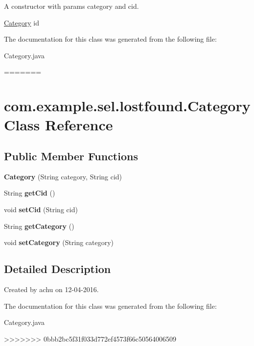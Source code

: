 A constructor with params category and cid. 

\hyperlink{classcom_1_1example_1_1sel_1_1lostfound_1_1Category}{Category} id 

The documentation for this class was generated from the following file\-:\begin{DoxyCompactItemize}
\item 
Category.\-java\end{DoxyCompactItemize}
=======
\hypertarget{classcom_1_1example_1_1sel_1_1lostfound_1_1Category}{\section{com.\-example.\-sel.\-lostfound.\-Category \-Class \-Reference}
\label{classcom_1_1example_1_1sel_1_1lostfound_1_1Category}
}
\subsection*{\-Public \-Member \-Functions}
\begin{DoxyCompactItemize}
\item 
\hypertarget{classcom_1_1example_1_1sel_1_1lostfound_1_1Category_a01e1a68dd2639ab6bee0007cc1dcf294}{{\bfseries \-Category} (\-String category, \-String cid)}\label{classcom_1_1example_1_1sel_1_1lostfound_1_1Category_a01e1a68dd2639ab6bee0007cc1dcf294}

\item 
\hypertarget{classcom_1_1example_1_1sel_1_1lostfound_1_1Category_a9394ecafd86528fa00554aecbc76ebdb}{\-String {\bfseries get\-Cid} ()}\label{classcom_1_1example_1_1sel_1_1lostfound_1_1Category_a9394ecafd86528fa00554aecbc76ebdb}

\item 
\hypertarget{classcom_1_1example_1_1sel_1_1lostfound_1_1Category_ae020ac053079f77939440df880c105d7}{void {\bfseries set\-Cid} (\-String cid)}\label{classcom_1_1example_1_1sel_1_1lostfound_1_1Category_ae020ac053079f77939440df880c105d7}

\item 
\hypertarget{classcom_1_1example_1_1sel_1_1lostfound_1_1Category_aad1c1ed95ef449791e1e27725ed60314}{\-String {\bfseries get\-Category} ()}\label{classcom_1_1example_1_1sel_1_1lostfound_1_1Category_aad1c1ed95ef449791e1e27725ed60314}

\item 
\hypertarget{classcom_1_1example_1_1sel_1_1lostfound_1_1Category_a64b466d2eed1b6eafe4d2a5785aaf7e4}{void {\bfseries set\-Category} (\-String category)}\label{classcom_1_1example_1_1sel_1_1lostfound_1_1Category_a64b466d2eed1b6eafe4d2a5785aaf7e4}

\end{DoxyCompactItemize}


\subsection{\-Detailed \-Description}
\-Created by achu on 12-\/04-\/2016. 

\-The documentation for this class was generated from the following file\-:\begin{DoxyCompactItemize}
\item 
\-Category.\-java\end{DoxyCompactItemize}
>>>>>>> 0bbb2bc5f31f033d772ef4573f66c50564006509
